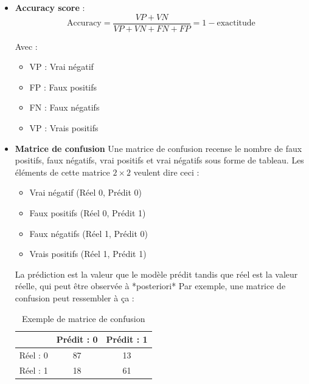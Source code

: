\begin{itemize}

    \item \textbf{Accuracy score} : 
        \begin{equation}
            \text{Accuracy} = \frac{VP + VN}{VP + VN + FN + FP} = 1 - \text{exactitude}
        \end{equation} 

    Avec : \newline

    \begin{itemize}
        \item  VP : Vrai négatif   \\
        \item  FP : Faux positifs  \\
        \item  FN : Faux négatifs  \\
        \item  VP : Vrais positifs \\
    \end{itemize} 

    \item \textbf{Matrice de confusion} \newline
    Une matrice de confusion recense le nombre de faux positifs, faux négatifs, vrai positifs et vrai négatifs 
    sous forme de tableau. Les éléments de cette matrice $2 \times 2$ veulent dire ceci : \newline

    \begin{itemize}
        \item  Vrai négatif (Réel 0, Prédit 0)   \\
        \item  Faux positifs (Réel 0, Prédit 1)  \\
        \item  Faux négatifs (Réel 1, Prédit 0)  \\ 
        \item  Vrais positifs (Réel 1, Prédit 1) \\
    \end{itemize}

    La prédiction est la valeur que le modèle prédit tandis que réel est la valeur réelle, qui peut être observée à *posteriori*
    Par exemple, une matrice de confusion peut ressembler à ça : \newline


    \begin{table}[h!]
    \scriptsize
    \begin{tabularx}{\textwidth}{|C|C|C|}
    \hline
      &\textbf{Prédit : 0}   & \textbf{Prédit : 1}  \\
    \hline
    Réel : 0 & 87 & 13 \\
    \hline
    Réel : 1 & 18 & 61 \\
    \hline
    \end{tabularx}
    \caption{Exemple de matrice de confusion}
    \end{table}


\end{itemize}
